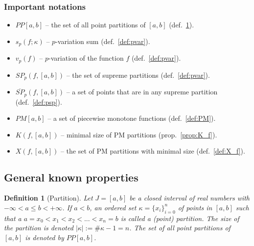 \documentclass[12pt, a4paper]{article}
\newtheorem{definition}[theorem]{Definition}
\numberwithin{equation}{section}
\begin{document}
\subsubsection*{Important notations}
\begin{itemize}  
  \item $PP[a,b]$ --  the set of all point partitions of $[a,b]$
    (def.~\ref{def:pp}).
  \item $s_{p}(f;\kappa)$ --  $p$-variation sum (def.~\ref{def:pvar}).
  \item $v_{p}\left( f\right)$ -- $p$-variation of the function $f$
    (def.~\ref{def:pvar}).
  \item $SP_{p}(f,[a,b])$ -- the set of supreme partitions
    (def.~\ref{def:pvar}).
  \item $\overline{SP}_{p}(f,[a,b])$ -- a set of points that are
    in any supreme partition (def.~\ref{def:psp}).
  \item $PM[a,b]$ -- a set of piecewise monotone functions
    (def.~\ref{def:PM}).  
  \item $K(f,[a,b])$ -- minimal size of PM partitions
    (prop.~\ref{prop:K_f}).
  \item $X(f,[a,b])$ -- the set of PM partitions with minimal size
    (def.~\ref{def:X_f}).
\end{itemize} 


\subsection{General known properties}
  
  
\begin{definition}[Partition]\label{def:pp}
  Let $J = [a,b]$ be a closed interval of real numbers with 
  $-\infty < a \leq b <+\infty$. 
  If $a < b$, an ordered set $\kappa = \{x_{i}\}_{i=0}^{n}$ 
  of points in $[a,b]$ such that a  
  $a=x_{0}<x_{1}<x_{2}<...<x_{n}=b$ is called a \emph{(point) partition}. 
  The size of the partition is denoted $\left|\kappa \right| :=\#\kappa-1=n$. 
  The set of all point partitions of $[a,b]$ is denoted by $PP[a,b]$.  
\end{definition} 
 
\end{document}
